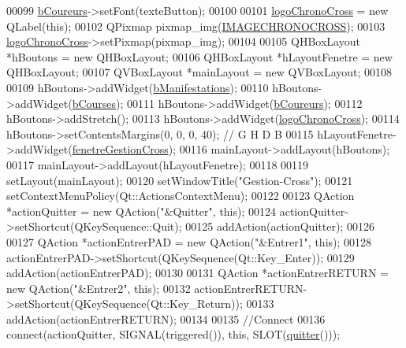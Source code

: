 \begin{DoxyCode}
00099     \hyperlink{class_i_h_m_gestion_cross_ac2819198bae00b7e0f23e8bc491b4cbb}{bCoureurs}->setFont(texteButton);
00100 
00101     \hyperlink{class_i_h_m_gestion_cross_a2025ba71cf1bdbfbec56a8f5552d7a83}{logoChronoCross} = \textcolor{keyword}{new} QLabel(\textcolor{keyword}{this});
00102     QPixmap pixmap\_img(\hyperlink{ihmchronocross_8h_aa8bee638aa78f9b332485225ecc8e75e}{IMAGECHRONOCROSS});
00103     \hyperlink{class_i_h_m_gestion_cross_a2025ba71cf1bdbfbec56a8f5552d7a83}{logoChronoCross}->setPixmap(pixmap\_img);
00104 
00105     QHBoxLayout *hBoutons = \textcolor{keyword}{new} QHBoxLayout;
00106     QHBoxLayout *hLayoutFenetre = \textcolor{keyword}{new} QHBoxLayout;
00107     QVBoxLayout *mainLayout = \textcolor{keyword}{new} QVBoxLayout;
00108 
00109     hBoutons->addWidget(\hyperlink{class_i_h_m_gestion_cross_a540b4525e546b6d61988245ae53768ce}{bManifestations});
00110     hBoutons->addWidget(\hyperlink{class_i_h_m_gestion_cross_a0df377aec07ada51a115cc458854c966}{bCourses});
00111     hBoutons->addWidget(\hyperlink{class_i_h_m_gestion_cross_ac2819198bae00b7e0f23e8bc491b4cbb}{bCoureurs});
00112     hBoutons->addStretch();
00113     hBoutons->addWidget(\hyperlink{class_i_h_m_gestion_cross_a2025ba71cf1bdbfbec56a8f5552d7a83}{logoChronoCross});
00114     hBoutons->setContentsMargins(0, 0, 0, 40); \textcolor{comment}{// G H D B}
00115     hLayoutFenetre->addWidget(\hyperlink{class_i_h_m_gestion_cross_a2ae4807c25f35813507ff0a2abb2ffb3}{fenetreGestionCross});
00116     mainLayout->addLayout(hBoutons);
00117     mainLayout->addLayout(hLayoutFenetre);
00118 
00119     setLayout(mainLayout);
00120     setWindowTitle(\textcolor{stringliteral}{"Gestion-Cross"});
00121     setContextMenuPolicy(Qt::ActionsContextMenu);
00122 
00123     QAction *actionQuitter = \textcolor{keyword}{new} QAction(\textcolor{stringliteral}{"&Quitter"}, \textcolor{keyword}{this});
00124     actionQuitter->setShortcut(QKeySequence::Quit);
00125     addAction(actionQuitter);
00126 
00127     QAction *actionEntrerPAD = \textcolor{keyword}{new} QAction(\textcolor{stringliteral}{"&Entrer1"}, \textcolor{keyword}{this});
00128     actionEntrerPAD->setShortcut(QKeySequence(Qt::Key\_Enter));
00129     addAction(actionEntrerPAD);
00130 
00131     QAction *actionEntrerRETURN = \textcolor{keyword}{new} QAction(\textcolor{stringliteral}{"&Entrer2"}, \textcolor{keyword}{this});
00132     actionEntrerRETURN->setShortcut(QKeySequence(Qt::Key\_Return));
00133     addAction(actionEntrerRETURN);
00134 
00135     \textcolor{comment}{//Connect}
00136     connect(actionQuitter, SIGNAL(triggered()), \textcolor{keyword}{this}, SLOT(\hyperlink{class_i_h_m_gestion_cross_a9c24746993f720c1067cfe7396ecd5c4}{quitter}()));

\end{DoxyCode}
